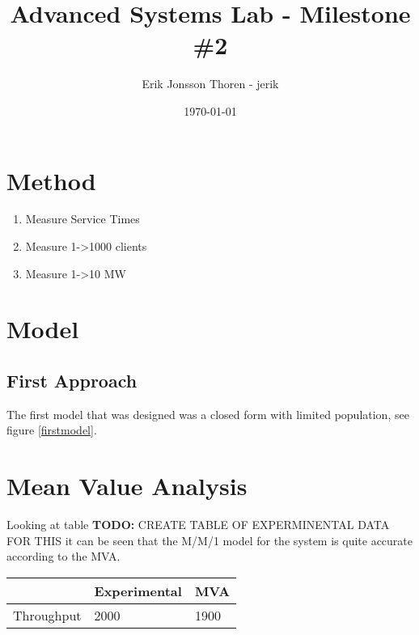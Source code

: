 \documentclass[a4paper, 11pt]{article}
\title{Advanced Systems Lab - Milestone \#2}
\author{Erik Jonsson Thoren - jerik\\}
\date{\today}
\newcommand{\TODO}[1]{\textbf{TODO:} #1}
\begin{document}
\maketitle

\section{Method}
\begin{enumerate}
	\item Measure Service Times
	\item Measure 1->1000 clients
	\item Measure 1->10 MW
\end{enumerate}

\section{Model}
\subsection{First Approach}
The first model that was designed was a closed form with limited population, see figure \ref{firstmodel}.




\section{Mean Value Analysis}
Looking at table \TODO{CREATE TABLE OF EXPERMINENTAL DATA FOR THIS} it can be seen that the M/M/1 model for the system is quite accurate according to the MVA.

\begin{table}
    \begin{tabular}{|l|l|l|}
    \hline
    ~          & Experimental & MVA  \\ \hline
    Throughput & 2000         & 1900 \\ \hline
    \end{tabular}
\end{table}
\end{document}
